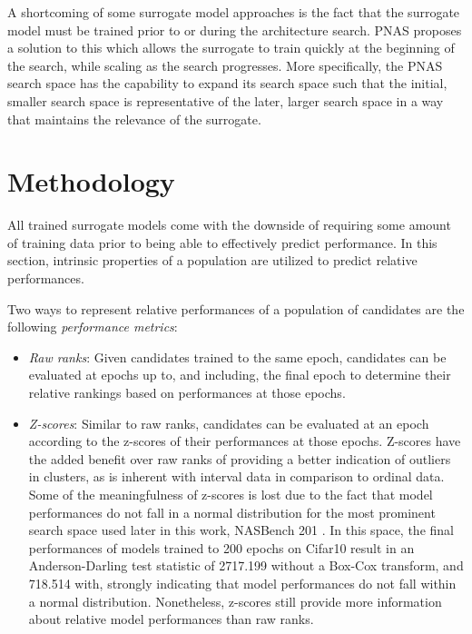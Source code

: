 \documentclass[twocolumn]{article}
\begin{document}
A shortcoming of some surrogate model approaches \cite{peephole}\cite{bayesian_pred}\cite{vsvr_pred} is the fact that the surrogate model must be trained prior to or during the architecture search.
PNAS \cite{pnas} proposes a solution to this which allows the surrogate to train quickly at the beginning of the search, while scaling as the search progresses.
More specifically, the PNAS search space has the capability to expand its search space such that the initial, smaller search space is representative of the later,
larger search space in a way that maintains the relevance of the surrogate.

\section{Methodology}

All trained surrogate models come with the downside of requiring some amount of training data prior to being able to effectively predict performance.
In this section, intrinsic properties of a population are utilized to predict relative performances.

Two ways to represent relative performances of a population of candidates are the following \emph{performance metrics}:
\begin{itemize}
    \item \emph{Raw ranks}: Given candidates trained to the same epoch, 
        candidates can be evaluated at epochs up to, and including, the final epoch to determine their relative rankings based on performances at those epochs.
    \item \emph{Z-scores}: Similar to raw ranks, candidates can be evaluated at an epoch according to the z-scores of their performances at those epochs.
        Z-scores have the added benefit over raw ranks of providing a better indication of outliers in clusters, as is inherent with interval data 
        in comparison to ordinal data.
        Some of the meaningfulness of z-scores is lost due to the fact that model performances do not fall in a normal distribution for the most prominent 
        search space used later in this work, NASBench 201 \cite{nasbench201}.
        In this space, the final performances of models trained to 200 epochs on Cifar10 result in an Anderson-Darling test statistic of 2717.199 without a 
        Box-Cox transform, and 718.514 with, strongly indicating that model performances do not fall within a normal distribution.
        Nonetheless, z-scores still provide more information about relative model performances than raw ranks.

\end{itemize}
\end{document}
